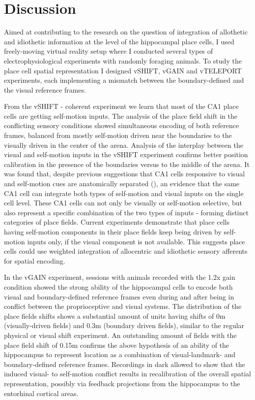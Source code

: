 \chapter{Discussion}
\label{ch:discussion}

Aimed at contributing to the research on the question of integration of allothetic and idiothetic information at the level of the hippocampal place cells, I used freely-moving virtual reality setup where I conducted several types of electrophysiological experiments with randomly foraging animals. To study the place cell spatial representation I designed vSHIFT, vGAIN and vTELEPORT experiments, each implementing a mismatch between the boundary-defined and the visual reference frames.

From the vSHIFT - coherent experiment we learn that most of the CA1 place cells are getting self-motion inputs. The analysis of the place field shift in the conflicting sensory conditions showed simultaneous encoding of both reference frames, balanced from mostly self-motion driven near the boundaries to the visually driven in the center of the arena. Analysis of the interplay between the visual and self-motion inputs in the vSHIFT experiment confirms better position calibration in the presence of the boundaries versus to the middle of the arena. It was found that, despite previous suggestions that CA1 cells responsive to visual and self-motion cues are anatomically separated (\cite{Fattahi2018}), an evidence that the same CA1 cell can integrate both types of self-motion and visual inputs on the single cell level. These CA1 cells can not only be visually or self-motion selective, but also represent a specific combination of the two types of inputs - forming distinct categories of place fields. Current experiments demonstrate that place cells having self-motion components in their place fields keep being driven by self-motion inputs only, if the visual component is not available. This suggests place cells could use weighted integration of allocentric and idiothetic sensory afferents for spatial encoding.

In the vGAIN experiment, sessions with animals recorded with the 1.2x gain condition showed the strong ability of the hippocampal cells to encode both visual and boundary-defined reference frames even during and after being in conflict between the proprioceptive and visual systems. The distribution of the place fields shifts shows a substantial amount of units having shifts of 0m (visually-driven fields) and 0.3m (boundary driven fields), similar to the regular physical or visual shift experiment. An outstanding amount of fields with the place field shift of 0.15m confirms the above hypothesis of an ability of the hippocampus to represent location as a combination of visual-landmark- and boundary-defined reference frames. Recordings in dark allowed to show that the induced visual- to self-motion conflict results in recalibration of the overall spatial representation, possibly via feedback projections from the hippocampus to the entorhinal cortical areas.

